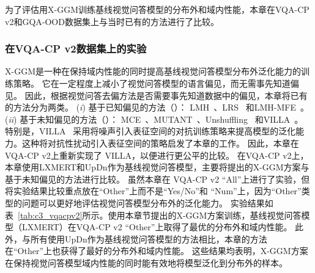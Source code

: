 为了评估用X-GGM训练基线视觉问答模型的分布外和域内性能，本章在VQA-CP v2和GQA-OOD数据集上与当时已有的方法进行了比较。



\subsubsection{在VQA-CP v2数据集上的实验}
X-GGM是一种在保持域内性能的同时提高基线视觉问答模型分布外泛化能力的训练策略。
它在一定程度上减小了视觉问答模型的语言偏见，而无需事先知道偏见。
因此，根据视觉问答去偏方法是否需要事先知道数据中的偏见，本章将已有的方法分为两类。
(\emph{i}) 基于已知偏见的方法（）： LMH~\cite{clark2019don}、LRS~\cite{guo2021loss} 和LMH-MFE~\cite{gat2020removing}。
(\emph{ii}) 基于未知偏见的方法（）： MCE~\cite{clark2020learning}、MUTANT~\cite{gokhale2020mutant}、Unshuffling~\cite{teney2020unshuffling} 和VILLA~\cite{gan2020large}。
特别是，VILLA~\cite{gan2020large} 采用将噪声引入表征空间的对抗训练策略来提高模型的泛化能力。这种将对抗性扰动引入表征空间的策略启发了本章的工作。
因此，本章在VQA-CP v2上重新实现了 VILLA，以便进行更公平的比较。
在VQA-CP v2上，本章使用LXMERT和UpDn作为基线视觉问答模型，主要将提出的X-GGM方案与基于未知偏见的方法进行比较。
虽然本章在 VQA-CP v2 ``All''上进行了实验，但将实验结果比较重点放在``Other''上而不是``Yes/No''和 ``Num''上，因为``Other''类型的问题可以更好地评估视觉问答模型分布外的泛化能力。 
实验结果如表~\ref{tab:c3_vqacpv2}所示。使用本章节提出的X-GGM方案训练，基线视觉问答模型（LXMERT）在VQA-CP v2 ``Other''上取得了最优的分布外和域内性能。
此外，与所有使用UpDn作为基线视觉问答模型的方法相比，本章的方法在“Other”上也获得了最好的分布外和域内性能。
这些结果均表明，X-GGM方案在保持视觉问答模型域内性能的同时能有效地将模型泛化到分布外的样本。




